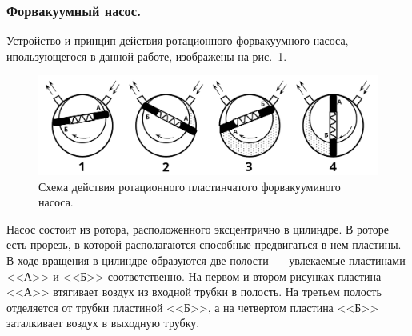 \documentclass[a4paper,11pt]{article}
\begin{document}
\subsubsection{Форвакуумный насос.}
Устройство и принцип действия ротационного форвакуумного насоса, ипользующегося в данной работе, изображены на рис.~\ref{fig:img2}.\\
\begin{figure}
  \includegraphics[scale = 0.175]{scheme2.png}
  \caption{Схема действия ротационного пластинчатого форвакууминого насоса.}
  \label{fig:img2}
\end{figure}
Насос состоит из ротора, расположенного эксцентрично в цилиндре. В роторе есть прорезь, в которой располагаются способные предвигаться в нем пластины. В ходе вращения в цилиндре образуются две полости~--- увлекаемые пластинами <<А>> и <<Б>> соответственно. На первом и втором рисунках пластина <<А>> втягивает воздух из входной трубки в полость. На третьем полость отделяется от трубки пластиной <<Б>>, а на четвертом пластина <<Б>> заталкивает воздух в выходную трубку.
\end{document}
